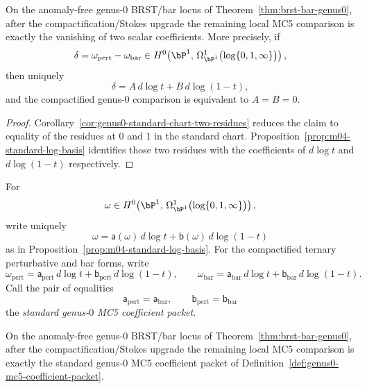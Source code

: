 \begin{corollary}
\label{cor:genus0-two-coefficient-packet}
On the anomaly-free genus-$0$ BRST/bar locus of
Theorem~\ref{thm:brst-bar-genus0}, after the compactification/Stokes
upgrade the remaining local MC5 comparison is exactly the vanishing of
two scalar coefficients. More precisely, if
\[
\delta = \omega_{\mathrm{pert}} - \omega_{\mathrm{bar}}
\in H^0\!\left(\bP^1,\,
\Omega^1_{\bP^1}\bigl(\log\{0,1,\infty\}\bigr)\right),
\]
then uniquely
\[
\delta = A\, d\log t + B\, d\log(1-t),
\]
and the compactified genus-$0$ comparison is equivalent to
$A=B=0$.
\end{corollary}

\begin{proof}
Corollary~\ref{cor:genus0-standard-chart-two-residues} reduces the
claim to equality of the residues at $0$ and $1$ in the
standard chart. Proposition~\ref{prop:m04-standard-log-basis}
identifies those two residues with the coefficients of
$d\log t$ and $d\log(1-t)$ respectively.
\end{proof}

\begin{definition}
\label{def:genus0-mc5-coefficient-packet}
For
\[
\omega \in H^0\!\left(\bP^1,\,
\Omega^1_{\bP^1}\bigl(\log\{0,1,\infty\}\bigr)\right),
\]
write uniquely
\[
\omega=\mathsf{a}(\omega)\,d\log t+\mathsf{b}(\omega)\,d\log(1-t)
\]
as in Proposition~\ref{prop:m04-standard-log-basis}. For the
compactified ternary perturbative and bar forms, write
\[
\omega_{\mathrm{pert}}
= \mathsf{a}_{\mathrm{pert}}\,d\log t
 + \mathsf{b}_{\mathrm{pert}}\,d\log(1-t),
\qquad
\omega_{\mathrm{bar}}
= \mathsf{a}_{\mathrm{bar}}\,d\log t
 + \mathsf{b}_{\mathrm{bar}}\,d\log(1-t).
\]
Call the pair of equalities
\[
\mathsf{a}_{\mathrm{pert}}=\mathsf{a}_{\mathrm{bar}},
\qquad
\mathsf{b}_{\mathrm{pert}}=\mathsf{b}_{\mathrm{bar}}
\]
the \emph{standard genus-$0$ MC5 coefficient packet}.
\end{definition}

\begin{corollary}
\label{cor:genus0-named-coefficient-packet}
On the anomaly-free genus-$0$ BRST/bar locus of
Theorem~\ref{thm:brst-bar-genus0}, after the compactification/Stokes
upgrade the remaining local MC5 comparison is exactly the standard
genus-$0$ MC5 coefficient packet of
Definition~\ref{def:genus0-mc5-coefficient-packet}.
\end{corollary}

